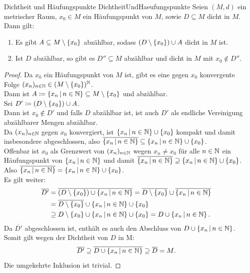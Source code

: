 \begin{lemma}{Dichtheit und Häufungspunkte}
             {DichtheitUndHaeufungspunkte}
Seien $(M, d)$ ein metrischer Raum, $x_0\in M$
ein Häufungspunkt von $M$, sowie $D \subseteq M$ dicht in $M$.\\
Dann gilt:
\begin{enumerate}[(1)]
	\item \label{DichtheitUndHaeufungspunkte1}
	Es gibt $A \subseteq M\setminus\left\{x_0\right\}$ abzählbar, sodass
	$(D\setminus\left\{x_0\right\}) \cup A$ dicht in $M$ ist.
	\item \label{DichtheitUndHaeufungspunkte2}
	Ist $D$ abzählbar, so gibt es $D'' \subseteq M$ abzählbar und dicht in
	$M$ mit $x_0 \notin D''$.
\end{enumerate}
\end{lemma}
\begin{proof}
Da $x_0$ ein Häufungspunkt von $M$ ist, gibt es eine gegen $x_0$ konvergente
Folge $(x_{n})_{n \in \mathbb{N}}\in(M\setminus\left\{x_0\right\})^{\mathbb{N}}$.\\Dann ist
$A\coloneqq \left\{x_n\,|\,n\in \mathbb{N}\right\} \subseteq M\setminus\left\{x_0\right\}$ und abzählbar.\\
Sei $D'\coloneqq  \left(D \setminus \left\{x_0\right\} \right) \cup A$.\\
Dann ist $x_0\notin D'$ und falls $D$ abzählbar ist, ist auch $D'$ als endliche
Vereinigung abzählbarer Mengen abzählbar.\\
Da $(x_{n})_{n \in \mathbb{N}}$ gegen $x_0$ konvergiert, ist
$\left\{x_n\,|\,n \in \mathbb{N}\right\} \cup \left\{x_0\right\}$ kompakt und damit insbesondere
abgeschlossen, also 
$\overline{\left\{x_n\,|\,n\in\mathbb{N}\right\}}\subseteq\left\{x_n\,|\,n\in\mathbb{N}\right\}\cup\left\{x_0\right\}$.\\
Offenbar ist $x_0$ als Grenzwert von $(x_{n})_{n \in \mathbb{N}}$ wegen $x_n\neq x_0$ für
alle $n \in \mathbb{N}$ ein Häufungspunkt von $\left\{x_n\,|\,n \in \mathbb{N}\right\}$ und damit 
$\overline{\left\{x_n\,|\,n\in\mathbb{N}\right\}}\supseteq\left\{x_n\,|\,n\in\mathbb{N}\right\}\cup\left\{x_0\right\}$.\\
Also $\overline{\left\{x_n\,|\,n\in\mathbb{N}\right\}}=\left\{x_n\,|\,n\in\mathbb{N}\right\}\cup\left\{x_0\right\}$.\\
Es gilt weiter:
\begin{align*}\overline{D'} 
&=\overline{\left(D \setminus \left\{x_0\right\} \right) \cup \left\{x_n\,|\,n \in \mathbb{N}\right\}}
=\overline{D \setminus \left\{x_0\right\}} \cup \overline {\left\{x_n\,|\,n \in \mathbb{N}\right\}}\\
&= \overline{D \setminus \left\{x_0\right\}} \cup \left\{x_n\,|\,n \in \mathbb{N}\right\}\cup\left\{x_0\right\}\\
&\supseteq D \setminus \left\{x_0\right\} \cup \left\{x_n\,|\,n \in \mathbb{N}\right\}\cup\left\{x_0\right\}
= D \cup\left\{x_n\,|\,n \in \mathbb{N}\right\}\text.
\end{align*}
Da $\overline {D'}$ abgeschlossen ist, enthält es auch den Abschluss von
$D \cup\left\{x_n\,|\,n \in \mathbb{N}\right\}$. Somit gilt wegen der Dichtheit von $D$ in M:
\[\overline{D'} \supseteq \overline{D \cup\left\{x_n\,|\,n \in \mathbb{N}\right\}} \supseteq
\overline D = M\text.\]
Die umgekehrte Inklusion ist trivial.
\end{proof}